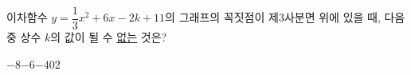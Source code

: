 \hspace*{2mm}\begin{minipage}[t]{\dimexpr\linewidth-2mm\relax}\vspace{0pt}
이차함수 $y=\dfrac{1}{3}x^2+6x-2k+11$의 그래프의 꼭짓점이 제$3$사분면 위에 있을 때, 다음 중 상수 $k$의 값이 될 수 \underline{없는} 것은?
\begin{choices32}{$-8$}{$-6$}{$-4$}{$0$}{$2$}\end{choices32}\end{minipage}

